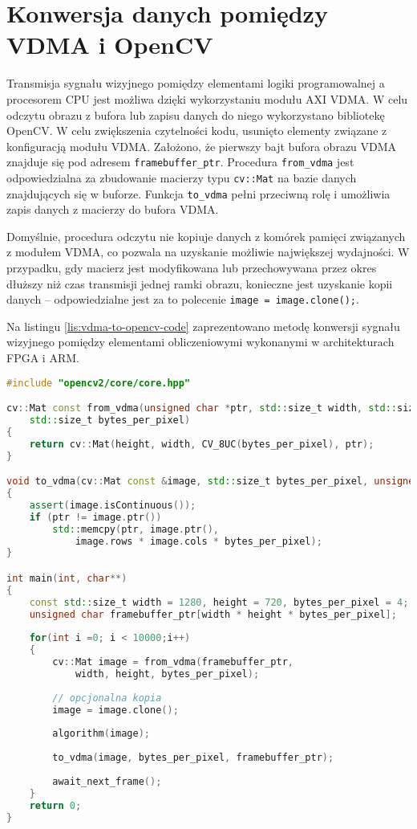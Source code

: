 \section{Konwersja danych pomiędzy VDMA i OpenCV}
\label{sec:vdma-to-opencv}

Transmisja sygnału wizyjnego pomiędzy elementami logiki programowalnej a procesorem CPU jest możliwa dzięki wykorzystaniu modułu AXI VDMA. W celu odczytu obrazu z bufora lub zapisu danych do niego wykorzystano bibliotekę OpenCV. W celu zwiększenia czytelności kodu, usunięto elementy związane z konfiguracją modułu VDMA. Założono, że pierwszy bajt bufora obrazu VDMA znajduje się pod adresem \texttt{framebuffer\_ptr}. Procedura \texttt{from\_vdma} jest odpowiedzialna za zbudowanie macierzy typu \texttt{cv::Mat} na bazie danych znajdujących się w buforze. Funkcja \texttt{to\_vdma} pełni przeciwną rolę i umożliwia zapis danych z macierzy do bufora VDMA.

Domyślnie, procedura odczytu nie kopiuje danych z komórek pamięci związanych z modułem VDMA, co pozwala na uzyskanie możliwie największej wydajności. W przypadku, gdy macierz jest modyfikowana lub przechowywana przez okres dłuższy niż czas transmisji jednej ramki obrazu, konieczne jest uzyskanie kopii danych -- odpowiedzialne jest za to polecenie \texttt{image = image.clone();}.

Na listingu \ref{lis:vdma-to-opencv-code} zaprezentowano metodę konwersji sygnału wizyjnego pomiędzy elementami obliczeniowymi wykonanymi w architekturach FPGA i ARM.


\begin{lstlisting}[language=C++, label=lis:vdma-to-opencv-code, caption=Konwersja sygnału wizyjnego pomiędzy AXI VDMA i \texttt{cv::Mat}.]
#include "opencv2/core/core.hpp"

cv::Mat const from_vdma(unsigned char *ptr, std::size_t width, std::size_t height,
	std::size_t bytes_per_pixel)
{
	return cv::Mat(height, width, CV_8UC(bytes_per_pixel), ptr);
}

void to_vdma(cv::Mat const &image, std::size_t bytes_per_pixel, unsigned char *ptr)
{
	assert(image.isContinuous());
	if (ptr != image.ptr())
		std::memcpy(ptr, image.ptr(),
			image.rows * image.cols * bytes_per_pixel);
}

int main(int, char**)
{
	const std::size_t width = 1280, height = 720, bytes_per_pixel = 4;
	unsigned char framebuffer_ptr[width * height * bytes_per_pixel];
	
	for(int i =0; i < 10000;i++)
	{
		cv::Mat image = from_vdma(framebuffer_ptr,
			width, height, bytes_per_pixel);
		
		// opcjonalna kopia
		image = image.clone();
		
		algorithm(image);
		
		to_vdma(image, bytes_per_pixel, framebuffer_ptr);
		
		await_next_frame();
	}
	return 0;
}

\end{lstlisting}